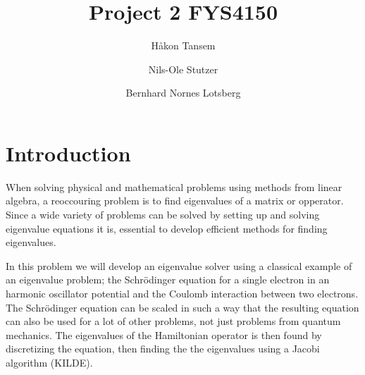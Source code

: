 \documentclass[twocolumn]{aastex62}
\begin{document}
\title{Project 2 FYS4150}




\author{Håkon Tansem}

\author{Nils-Ole Stutzer}

\author{Bernhard Nornes Lotsberg}

\begin{abstract}

\end{abstract}

\section{Introduction} \label{sec:intro}
When solving physical and mathematical problems using methods from linear algebra, a reoccouring problem is to find eigenvalues of a matrix or opperator. Since a wide variety of problems can be solved by setting up and solving eigenvalue equations it is, essential to develop efficient methods for finding eigenvalues.

In this problem we will develop an eigenvalue solver using a classical example of an eigenvalue problem; the Schrödinger equation for a single electron in an harmonic oscillator potential and the Coulomb interaction between two electrons. The Schrödinger equation can be scaled in such a way that the resulting equation can also be used for a lot of other problems, not just problems from quantum mechanics. The eigenvalues of the Hamiltonian operator is then found by discretizing the equation, then finding the the eigenvalues using a Jacobi algorithm (KILDE).
\end{document}
